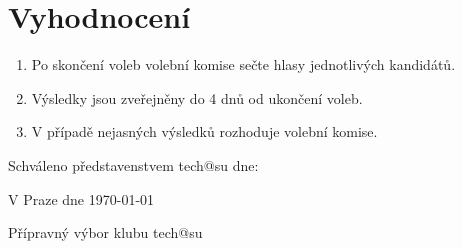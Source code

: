 \documentclass[10pt]{article}
\begin{document}
\section{Vyhodnocení}
	\begin{enumerate}
		\item Po skončení voleb volební komise sečte hlasy jednotlivých kandidátů.
		\item Výsledky jsou zveřejněny do 4 dnů od ukončení voleb.
		\item V případě nejasných výsledků rozhoduje volební komise.
	\end{enumerate}

\vspace{10mm}

Schváleno představenstvem tech@su dne:

\vspace{30mm}

\hfill V Praze dne \today

\hfill Přípravný výbor klubu tech@su
\end{document}
